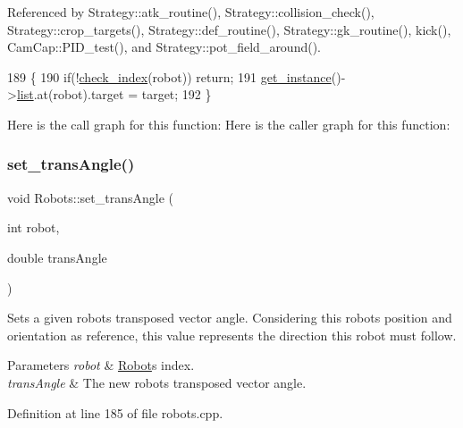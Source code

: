 Referenced by Strategy\+::atk\+\_\+routine(), Strategy\+::collision\+\_\+check(), Strategy\+::crop\+\_\+targets(), Strategy\+::def\+\_\+routine(), Strategy\+::gk\+\_\+routine(), kick(), Cam\+Cap\+::\+P\+I\+D\+\_\+test(), and Strategy\+::pot\+\_\+field\+\_\+around().


\begin{DoxyCode}
189                                                  \{
190     \textcolor{keywordflow}{if}(!\hyperlink{robots_8hpp_ae3e6ae8f87cdc750c0b99bc609d9ae43}{check\_index}(robot)) \textcolor{keywordflow}{return};
191     \hyperlink{class_robots_a589bce74db5f34af384952d48435168f}{get\_instance}()->\hyperlink{class_robots_a2c6b77265028f82a4342ca1ef15ed305}{list}.at(robot).target = target;
192 \}
\end{DoxyCode}
Here is the call graph for this function\+:
Here is the caller graph for this function\+:
\mbox{\label{class_robots_ac18c807efc15557ce996563bb76451ea}} 
\subsubsection{\texorpdfstring{set\+\_\+trans\+Angle()}{set\_transAngle()}}
{\footnotesize\ttfamily void Robots\+::set\+\_\+trans\+Angle (\begin{DoxyParamCaption}\item[{int}]{robot,  }\item[{double}]{trans\+Angle }\end{DoxyParamCaption})\hspace{0.3cm}{\ttfamily [static]}}

Sets a given robot\textquotesingle{}s transposed vector angle. Considering this robot\textquotesingle{}s position and orientation as reference, this value represents the direction this robot must follow. 
\begin{DoxyParams}{Parameters}
{\em robot} & \hyperlink{struct_robots_1_1_robot}{Robot}\textquotesingle{}s index. \\
\hline
{\em trans\+Angle} & The new robot\textquotesingle{}s transposed vector angle. \\
\hline
\end{DoxyParams}


Definition at line 185 of file robots.\+cpp.



